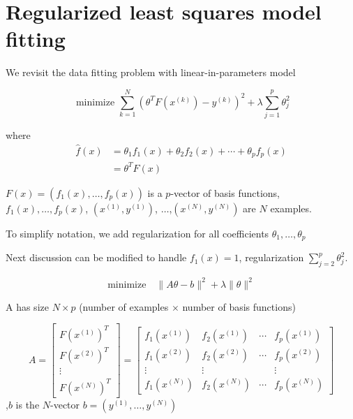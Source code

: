 \section{Regularized least squares model fitting}

We revisit the data fitting problem with linear-in-parameters model

\begin{problem}
    
$$\text{ minimize } \sum_{k=1}^{N}\left(\theta^{T} F\left(x^{(k)}\right)-y^{(k)}\right)^{2}+\lambda \sum_{j=1}^{p} \theta_{j}^{2}$$

 where  $$
    \begin{aligned}
    \hat{f}(x) &=\theta_{1} f_{1}(x)+\theta_{2} f_{2}(x)+\cdots+\theta_{p} f_{p}(x) \\
    &=\theta^{T} F(x)
    \end{aligned}
    $$

    $F(x)=\left(f_{1}(x), \ldots, f_{p}(x)\right)$ is a $p$-vector of basis functions, $f_{1}(x), \ldots, f_{p}(x)$, $\left(x^{(1)}, y^{(1)}\right)$, $\ldots$,$\left(x^{(N)}, y^{(N)}\right)$ are $N$ examples.
\end{problem}

To simplify notation, we add regularization for all coefficients $\theta_{1}, \ldots, \theta_{p}$

Next discussion can be modified to handle $f_{1}(x)=1$, regularization $\sum_{j=2}^{p} \theta_{j}^{2}$.

\begin{problem}
    $$\text{minimize} \quad\|A \theta-b\|^{2}+\lambda\|\theta\|^{2}$$
\end{problem}

A has size $N \times p$ (number of examples $\times$ number of basis functions)

$$
A=\left[\begin{array}{c}
F\left(x^{(1)}\right)^{T} \\
F\left(x^{(2)}\right)^{T} \\
\vdots \\
F\left(x^{(N)}\right)^{T}
\end{array}\right]=\left[\begin{array}{cccc}
f_{1}\left(x^{(1)}\right) & f_{2}\left(x^{(1)}\right) & \cdots & f_{p}\left(x^{(1)}\right) \\
f_{1}\left(x^{(2)}\right) & f_{2}\left(x^{(2)}\right) & \cdots & f_{p}\left(x^{(2)}\right) \\
\vdots & \vdots & & \vdots \\
f_{1}\left(x^{(N)}\right) & f_{2}\left(x^{(N)}\right) & \cdots & f_{p}\left(x^{(N)}\right)
\end{array}\right]
$$
,$b$ is the $N$-vector $b=\left(y^{(1)}, \ldots, y^{(N)}\right)$

